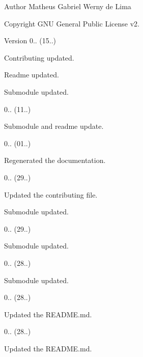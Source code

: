\begin{DoxyAuthor}{Author}
Matheus Gabriel Werny de Lima 
\end{DoxyAuthor}
\begin{DoxyCopyright}{Copyright}
G\+NU General Public License v2. 
\end{DoxyCopyright}
\begin{DoxyVersion}{Version}
0.. (15..)
\begin{DoxyItemize}
\item Contributing updated.
\item Readme updated.
\item Submodule updated. 
\end{DoxyItemize}

0.. (11..)
\begin{DoxyItemize}
\item Submodule and readme update. 
\end{DoxyItemize}

0.. (01..)
\begin{DoxyItemize}
\item Regenerated the documentation. 
\end{DoxyItemize}

0.. (29..)
\begin{DoxyItemize}
\item Updated the contributing file.
\item Submodule updated. 
\end{DoxyItemize}

0.. (29..)
\begin{DoxyItemize}
\item Submodule updated. 
\end{DoxyItemize}

0.. (28..)
\begin{DoxyItemize}
\item Submodule updated. 
\end{DoxyItemize}

0.. (28..)
\begin{DoxyItemize}
\item Updated the R\+E\+A\+D\+M\+E.\+md. 
\end{DoxyItemize}

0.. (28..)
\begin{DoxyItemize}
\item Updated the R\+E\+A\+D\+M\+E.\+md. 
\end{DoxyItemize}


\end{DoxyVersion}
